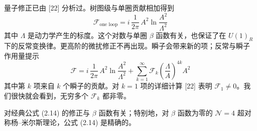 \documentclass[11pt,a4paper,UTF8,fontset=fandol]{ctexart}
\theoremstyle{plain}
\theoremstyle{definition}
\newcommand{\Ff}{\mathcal{F}}
\begin{document}
量子修正已由 [22] 分析过。树图级与单圈贡献相加得到
\begin{equation}
  \Ff_{\text{one loop}}=i\,\frac{1}{2\pi}\,A^2\ln\frac{A^2}{\Lambda^2} \tag{2.15}
\end{equation}
其中 $\Lambda$ 是动力学产生的标度。这个对数与单圈 $\beta$ 函数有关，也保证了在
$U(1)_R$ 下的反常变换律。更高阶的微扰修正不再出现。瞬子会带来新的项；反常与瞬子
作用量提示
\begin{equation}
  \Ff=i\,\frac{1}{2\pi}\,A^2\ln\frac{A^2}{\Lambda^2}
  +\sum_{k=1}^{\infty}\Ff_k\left(\frac{\Lambda}{A}\right)^{4k}A^2 \tag{2.16}
\end{equation}
其中第 $k$ 项来自 $k$ 个瞬子的贡献。对 $k=1$ 项的详细计算 [22] 表明
$\Ff_1\neq 0$。我们很快就会看到，无穷多个 $\Ff_k$ 都非零。

对经典公式 (2.14) 的修正与 $\beta$ 函数有关；特别地，对 $\beta$ 函数为零的
$\mathcal N=4$ 超对称杨--米尔斯理论，公式 (2.14) 是精确的。



\end{document}
